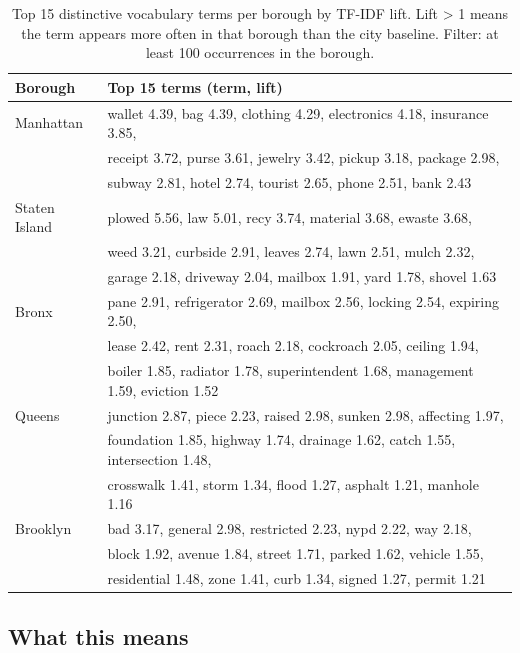 \documentclass[11pt,letterpaper]{book}
\begin{document}
\begin{table}[h]
  \caption{Top 15 distinctive vocabulary terms per borough by TF-IDF lift. Lift > 1 means the term appears more often in that borough than the city baseline. Filter: at least 100 occurrences in the borough.}
  \label{tab:borough-fp}
  \centering
  \footnotesize
  \begin{tabular}{ll}
    \toprule
    Borough & Top 15 terms (term, lift) \\
    \midrule
    Manhattan & wallet 4.39, bag 4.39, clothing 4.29, electronics 4.18, insurance 3.85, \\
              & receipt 3.72, purse 3.61, jewelry 3.42, pickup 3.18, package 2.98, \\
              & subway 2.81, hotel 2.74, tourist 2.65, phone 2.51, bank 2.43 \\
    \midrule
    Staten Island & plowed 5.56, law 5.01, recy 3.74, material 3.68, ewaste 3.68, \\
                  & weed 3.21, curbside 2.91, leaves 2.74, lawn 2.51, mulch 2.32, \\
                  & garage 2.18, driveway 2.04, mailbox 1.91, yard 1.78, shovel 1.63 \\
    \midrule
    Bronx & pane 2.91, refrigerator 2.69, mailbox 2.56, locking 2.54, expiring 2.50, \\
          & lease 2.42, rent 2.31, roach 2.18, cockroach 2.05, ceiling 1.94, \\
          & boiler 1.85, radiator 1.78, superintendent 1.68, management 1.59, eviction 1.52 \\
    \midrule
    Queens & junction 2.87, piece 2.23, raised 2.98, sunken 2.98, affecting 1.97, \\
           & foundation 1.85, highway 1.74, drainage 1.62, catch 1.55, intersection 1.48, \\
           & crosswalk 1.41, storm 1.34, flood 1.27, asphalt 1.21, manhole 1.16 \\
    \midrule
    Brooklyn & bad 3.17, general 2.98, restricted 2.23, nypd 2.22, way 2.18, \\
             & block 1.92, avenue 1.84, street 1.71, parked 1.62, vehicle 1.55, \\
             & residential 1.48, zone 1.41, curb 1.34, signed 1.27, permit 1.21 \\
    \bottomrule
  \end{tabular}
\end{table}

\subsection*{What this means}
\end{document}
